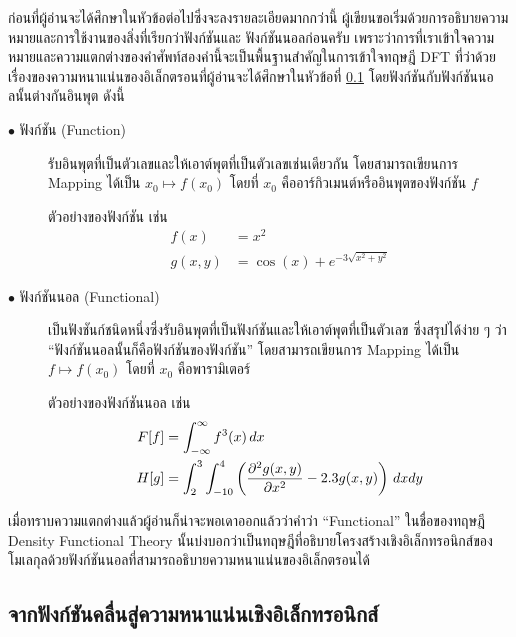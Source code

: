ก่อนที่ผู้อ่านจะได้ศึกษาในหัวข้อต่อไปซึ่งจะลงรายละเอียดมากกว่านี้ ผู้เขียนขอเริ่มด้วยการอธิบายความหมายและการใช้งานของสิ่งที่เรียกว่าฟังก์ชันและ%
ฟังก์ชันนอลก่อนครับ เพราะว่าการที่เราเข้าใจความหมายและความแตกต่างของคำศัพท์สองคำนี้จะเป็นพื้นฐานสำคัญในการเข้าใจทฤษฎี DFT ที่ว่าด้วย%
เรื่องของความหนาแน่นของอิเล็กตรอนที่ผู้อ่านจะได้ศึกษาในหัวข้อที่ \ref{ssec:elec_density} โดยฟังก์ชันกับฟังก์ชันนอลนั้นต่างกันอินพุต ดังนี้

\begin{description}
    \item[$\bullet$ ฟังก์ชัน (Function)] รับอินพุตที่เป็นตัวเลขและให้เอาต์พุตที่เป็นตัวเลขเช่นเดียวกัน โดยสามารถเขียนการ Mapping
        ได้เป็น $x_0 \mapsto f(x_0)$ โดยที่ $x_{0}$ คืออาร์กิวเมนต์หรืออินพุตของฟังก์ชัน $f$

        ตัวอย่างของฟังก์ชัน เช่น
        \begin{align*}
            f(x)   & = x^{2}                                \\
            g(x,y) & = \cos(x) + e^{-3\sqrt{x^{2} + y^{2}}}
        \end{align*}

    \item[$\bullet$ ฟังก์ชันนอล (Functional)] เป็นฟังชันก์ชนิดหนึ่งซึ่งรับอินพุตที่เป็นฟังก์ชันและให้เอาต์พุตที่เป็นตัวเลข ซึ่งสรุปได้ง่าย ๆ
        ว่า \enquote{ฟังก์ชันนอลนั้นก็คือฟังก์ชันของฟังก์ชัน} โดยสามารถเขียนการ Mapping ได้เป็น $f \mapsto f(x_0)$ โดยที่ $x_{0}$
        คือพารามิเตอร์

        ตัวอย่างของฟังก์ชันนอล เช่น
        \begin{align*}
            F[f] & = \int^{\infty}_{-\infty} f^{3}(x) \, dx                                                \\
            H[g] & = \int^{3}_{2} \int^{4}_{-10} \left ( \pdv[2]{g(x,y)}{x} - 2.3 g(x,y) \right ) \, dx dy
        \end{align*}
\end{description}

เมื่อทราบความแตกต่างแล้วผู้อ่านก็น่าจะพอเดาออกแล้วว่าคำว่า \enquote{Functional} ในชื่อของทฤษฎี Density Functional Theory
นั้นบ่งบอกว่าเป็นทฤษฎีที่อธิบายโครงสร้างเชิงอิเล็กทรอนิกส์ของโมเลกุลด้วยฟังก์ชันนอลที่สามารถอธิบายความหนาแน่นของอิเล็กตรอนได้

\subsection{จากฟังก์ชันคลื่นสู่ความหนาแน่นเชิงอิเล็กทรอนิกส์}
\label{ssec:elec_density}


